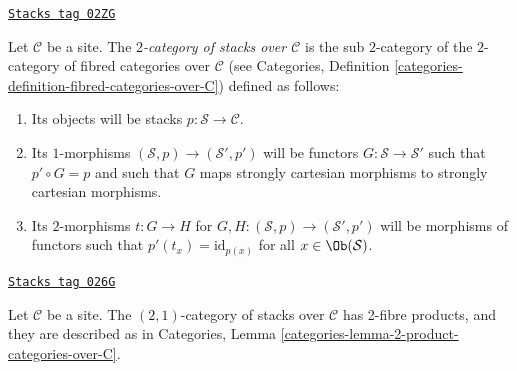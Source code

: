 \begin{definition}
\label{stacks-definition-stacks-over-C}
\href{https://stacks.math.columbia.edu/tag/02ZG}{\texttt{Stacks tag 02ZG}}

Let $\mathcal{C}$ be a site.
The {\it $2$-category of stacks over $\mathcal{C}$}
is the sub $2$-category of the $2$-category of fibred categories
over $\mathcal{C}$ (see
Categories, Definition \ref{categories-definition-fibred-categories-over-C})
defined as follows:
\begin{enumerate}
\item Its objects will be stacks $p : \mathcal{S} \to \mathcal{C}$.
\item Its $1$-morphisms $(\mathcal{S}, p) \to (\mathcal{S}', p')$
will be functors $G : \mathcal{S} \to \mathcal{S}'$ such that
$p' \circ G = p$ and such that $G$ maps strongly cartesian
morphisms to strongly cartesian morphisms.
\item Its $2$-morphisms $t : G \to H$ for
$G, H : (\mathcal{S}, p) \to (\mathcal{S}', p')$
will be morphisms of functors
such that $p'(t_x) = \text{id}_{p(x)}$
for all $x \in \Ob(\mathcal{S})$.
\end{enumerate}
\end{definition}

\begin{lemma}
\label{stacks-lemma-2-product-stacks}
\href{https://stacks.math.columbia.edu/tag/026G}{\texttt{Stacks tag 026G}}

Let $\mathcal{C}$ be a site.
The $(2, 1)$-category of stacks over $\mathcal{C}$
has 2-fibre products, and they are described as in
Categories, Lemma \ref{categories-lemma-2-product-categories-over-C}.
\end{lemma}

